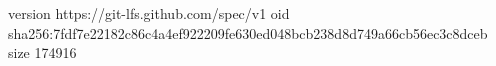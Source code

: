 version https://git-lfs.github.com/spec/v1
oid sha256:7fdf7e22182c86c4a4ef922209fe630ed048bcb238d8d749a66cb56ec3c8dceb
size 174916
